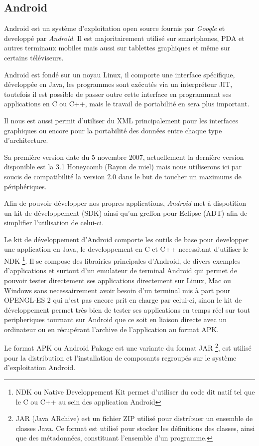 \subsection{Android}

	Android est un système d'exploitation open source fournis par \emph{Google} et
	developpé par \emph{Android}.
	Il est majoritairement utilisé sur smartphones, PDA et autres terminaux
	mobiles mais aussi sur tablettes graphiques et même sur certains téléviseurs.
	
	Android est fondé sur un noyau Linux, il comporte une interface
	spécifique, développée en Java, les programmes sont exécutés via un
	interpréteur JIT, toutefois il est possible de passer outre cette interface en
	programmant ses applications en C ou C++, mais le travail de portabilité en
	sera plus important.
	
	Il nous est aussi permit d'utiliser du XML principalement pour les interfaces
	graphiques ou encore pour la portabilité des données entre chaque type
	d'architecture.
	
	Sa première version date du 5 novembre 2007, actuellement la dernière version
	disponible est la 3.1 Honeycomb (Rayon de miel) mais nous utiliserons ici par
	soucis de compatibilité la version 2.0 dans le but de toucher un maximums de
	périphériques.
	
	Afin de pouvoir développer nos propres applications, \emph{Android} met à
	dispotition un kit de développement (SDK) ainsi qu'un greffon pour Eclipse
	(ADT) afin de simplifier l'utilisation de celui-ci.
	
	Le kit de développement d'Android comporte les outils de base pour developper une application en
	Java, le developpement en C et C++ necessitant d'utiliser le NDK \footnote{NDK
	ou Native Developpement Kit permet d'utiliser du code dit natif tel que le C
	ou C++ au sein des application Android}.
	Il se compose des librairies principales d'Android, de divers exemples
	d'applications et surtout d'un emulateur de terminal Android qui permet de
	pouvoir tester directement ses applications directement sur Linux, Mac ou
	Windows sans necessairrement avoir besoin d'un terminal mis à part pour
	OPENGL-ES 2 qui n'est pas encore prit en charge par celui-ci, sinon le kit de développement
	permet très bien de tester ses applications en temps réel sur tout
	peripheriques tournant sur Android que ce soit en liaison directe avec un
	ordinateur ou en récupérant l'archive de l'application au format APK.
	
	Le format APK ou Android Pakage est une variante du format
	JAR \footnote{JAR (Java ARchive) est un fichier ZIP utilisé pour distribuer un
	ensemble de classes Java. Ce format est utilisé pour stocker les définitions
	des  classes, ainsi que des métadonnées, constituant l'ensemble d'un
	programme.},  est utilisé pour la distribution et l'installation de composants
	regroupés sur le système d'exploitation Android.


